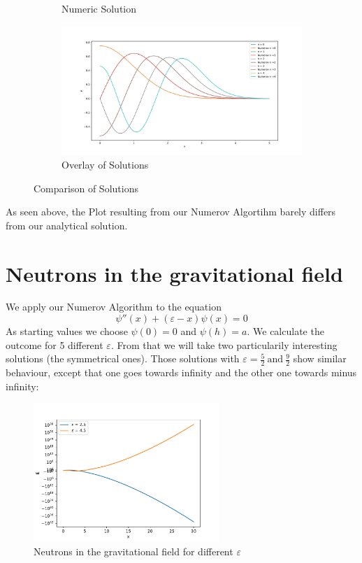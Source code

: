 \documentclass{article}
\begin{document}
\begin{figure}[H]
\begin{subfigure}{.49\textwidth}
    \caption{Numeric Solution}  
    \end{subfigure}
    \begin{subfigure}{\textwidth}
    \includegraphics[width=\textwidth]{Together.pdf} 
    \caption{Overlay of Solutions}  
    \end{subfigure}
    \caption{Comparison of Solutions}
\end{figure}

As seen above, the Plot resulting from our Numerov Algortihm barely differs from
our analytical solution.

\newpage
\section*{Neutrons in the gravitational field}
We apply our Numerov Algorithm to the equation
\[ 
    \psi '' (x) + ( \varepsilon - x ) \psi (x) = 0
\]
As starting values we choose \( \psi (0) = 0 \) and \( \psi (h) = a\).
We calculate the outcome for 5 different \( \varepsilon \). From that we will take
two particularily interesting solutions (the symmetrical ones). Those solutions
with \( \varepsilon = \frac{5}{2} \ \text{and} \ \frac{9}{2}\) show similar
behaviour, except that one goes towards infinity and the other one towards
minus infinity:
\begin{figure}[ht]
    \centering
    \includegraphics[width=7cm]{Neutron1.pdf} 
    \caption{Neutrons in the gravitational field for different \( \varepsilon \)} 
\end{figure}
\end{document}
